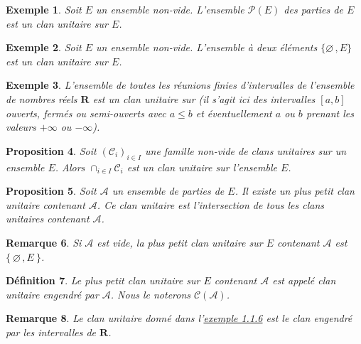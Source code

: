 \documentclass{scrreport}
\theoremstyle{def}
\newtheorem{definition}{Définition}
\newtheorem{example}[definition]{Exemple}
\theoremstyle{thm}
\theoremstyle{prop}
\newtheorem{proposition}[definition]{Proposition}
\theoremstyle{rem}
\newtheorem{remark}[definition]{Remarque}
\numberwithin{definition}{section}
\numberwithin{lemma}{section}
\numberwithin{proposition}{section}
\numberwithin{theorem}{section}
\numberwithin{corol}{section}
\numberwithin{notation}{section}
\numberwithin{example}{section}
\numberwithin{exercise}{section}
\numberwithin{remark}{section}
\newcommand{\OO}{\varnothing}
\newcommand{\R}{\mathbf{R}}
\newcommand{\scrA}{\mathscr{A}}
\newcommand{\scrC}{\mathscr{C}}
\newcommand{\scrP}{\mathscr{P}}
\newcommand{\p}{\:\!}
\begin{document}
\begin{example}\label{expl1:1:4}
	Soit \(E\) un ensemble non-vide. L'ensemble \(\scrP(E)\) des parties de \(E\) est un clan unitaire sur \(E\).
\end{example}

\begin{example}\label{expl1:1:5}
	Soit \(E\) un ensemble non-vide. L'ensemble à deux éléments \(\{\varnothing\,, E\}\) est un clan unitaire sur \(E\).
\end{example}

\begin{example}\label{expl1:1:6}
	L'ensemble de toutes les réunions finies d'intervalles de l'ensemble de nombres réels \(\R\) est un clan unitaire sur (il s'agit ici des intervalles \([a, b]\) ouverts, fermés ou semi-ouverts avec \(a \leqslant b\) et éventuellement \(a\) ou \(b\) prenant les valeurs \(+\infty\) ou \(-\infty\)).
\end{example}

\begin{proposition}\label{prop1:1:7}
	Soit \({(\scrC_i)}_{i \in I}\) une famille non-vide de clans unitaires sur un ensemble \(E\). Alors \(\cap_{i \in I} \scrC_i\) est un clan unitaire sur l'ensemble \(E\).
\end{proposition}

\begin{proposition}\label{prop1:1:8}
	Soit \(\scrA\) un ensemble de parties de \(E\). Il existe un plus petit clan unitaire contenant \(\scrA\). Ce clan unitaire est l'intersection de tous les clans unitaires contenant \(\scrA\).
\end{proposition}

\begin{remark}\label{rem1:1:9}
	Si \(\scrA\) est vide, la plus petit clan unitaire sur \(E\) contenant \(\scrA\) est \(\{\p \OO\,, E \p\}\).
\end{remark}

\begin{definition}\label{def1:1:10}
	Le plus petit clan unitaire sur \(E\) contenant \(\scrA\) est appelé clan unitaire engendré par \(\scrA\). Nous le noterons \(\scrC(\scrA)\).
\end{definition}

\begin{remark}\label{rem1:1:11}
	Le clan unitaire donné dans l'\hyperref[expl1:1:6]{exemple 1.1.6} est le clan engendré par les intervalles de \(\R\).
\end{remark}
\end{document}
